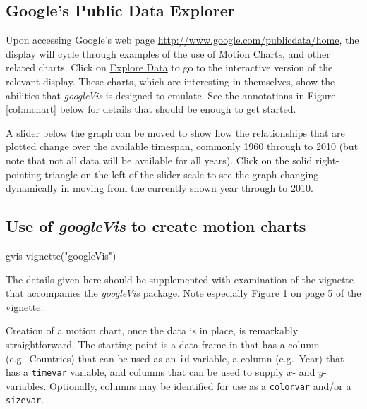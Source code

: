 \documentclass{tufte-book}\usepackage[]{graphicx}\usepackage[]{color}
\newcommand{\txtt}[1]{\texttt{#1}}
\begin{document}
\subsection*{Google's Public Data Explorer}

Upon accessing Google's web page
\url{http://www.google.com/publicdata/home}, the display will cycle
through examples of the use of Motion Charts, and other related
charts.  Click on \underline{Explore Data} to go to the interactive
version of the relevant display.  These charts, which are interesting in themselves,
show the abilities that {\em googleVis} is designed to emulate.  See
the annotations in Figure \ref{col:mchart} below for details that
should be enough to get started.

A slider below the graph can be moved to show how the relationships
that are plotted change over the available timespan, commonly 1960
through to 2010 (but note that not all data will be available for all
years).  Click on the solid right-pointing triangle on the left of
the slider scale to see the graph changing dynamically in moving from the
currently shown year through to 2010.

\subsection*{Use of {\em googleVis} to create motion charts}\label{ss:gvis}

\begin{SaveVerbatim}{gvis}
vignette("googleVis")
\end{SaveVerbatim}

The details given here should be supplemented with examination
of the vignette that accompanies the {\em
googleVis} package.  Note especially Figure 1 on page 5 of the
vignette.

Creation of a motion chart, once the data is in place, is remarkably
straightforward. The starting point is a data frame in that has a
column (e.g.\ Countries) that can be used as an \txtt{id} variable, a
column (e.g.\ Year) that has a \txtt{timevar} variable, and columns
that can be used to supply $x$- and $y$- variables.  Optionally,
columns may be identified for use as a \txtt{colorvar} and/or a
\txtt{sizevar}.
\end{document}
